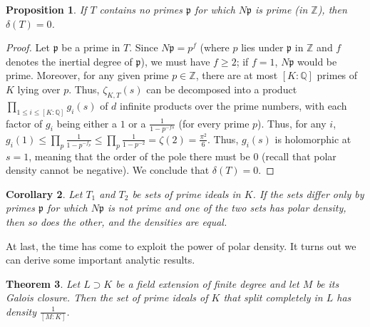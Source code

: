 \documentclass{article}
\newcommand{\QQ}{\mathbb{Q}}
\newcommand{\ZZ}{\mathbb{Z}}
\theoremstyle{plain}
\newtheorem{thm}{Theorem}
\newtheorem{cor}[thm]{Corollary}
\newtheorem{prop}[thm]{Proposition}
\theoremstyle{definition}
\theoremstyle{remark}
\numberwithin{equation}{section}
\numberwithin{thm}{section}
\begin{document}
\begin{prop} \label{4.3}
If $T$ contains no primes $\mathfrak{p}$ for which $N\mathfrak{p}$ is prime (in $\ZZ$), then $\delta(T) = 0$. 
\end{prop}

\begin{proof}
Let $\mathfrak{p}$ be a prime in $T$. Since $N\mathfrak{p} = p^{f}$ (where $p$ lies under $\mathfrak{p}$ in $\ZZ$ and $f$ denotes the inertial degree of $\mathfrak{p}$), we must have $f \geq 2$; if $f = 1$, $N\mathfrak{p}$ would be prime. Moreover, for any given prime $p \in \ZZ$, there are at most $[K : \QQ]$ primes of $K$ lying over $p$. Thus, $\zeta_{K, T}(s)$ can be decomposed into a product $\prod_{1 \leq i \leq [K : \QQ]} g_{i}(s)$ of $d$ infinite products over the prime numbers, with each factor of $g_i$ being either a $1$ or a $\frac{1}{1-p^{-fs}}$ (for every prime $p$). Thus, for any $i$, $g_{i}(1) \leq \prod_{p} \frac{1}{1-p^{-f_{p}}} \leq \prod_{p} \frac{1}{1-p^{-2}} = \zeta(2) = \frac{\pi^2}{6}$. Thus, $g_{i}(s)$ is holomorphic at $s = 1$, meaning that the order of the pole there must be $0$ (recall that polar density cannot be negative). We conclude that $\delta(T) = 0$. 
\end{proof}

\begin{cor} \label{4.4}
Let $T_1$ and $T_2$ be sets of prime ideals in $K$. If the sets differ only by primes $\mathfrak{p}$ for which $N\mathfrak{p}$ is not prime and one of the two sets has polar density, then so does the other, and the densities are equal. 
\end{cor}

At last, the time has come to exploit the power of polar density. It turns out we can derive some important analytic results.

\begin{thm} \label{4.5}
Let $L \supset K$ be a field extension of finite degree and let $M$ be its Galois closure. Then the set of prime ideals of $K$ that split completely in $L$ has density $\frac{1}{[M : K]}$. 
\end{thm}
\end{document}

